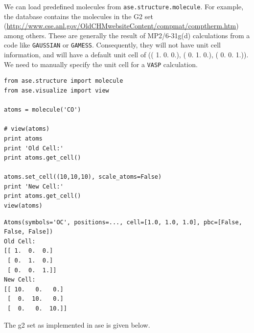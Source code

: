 \documentclass[11pt]{article}
\begin{document}
We can load predefined molecules from \verb~ase.structure.molecule~. For example, the database contains the molecules in the G2 set (\url{http://www.cse.anl.gov/OldCHMwebsiteContent/compmat/comptherm.htm}) among others. These are generally the result of MP2/6-31g(d) calculations from a code like \texttt{GAUSSIAN} or \texttt{GAMESS}. Consequently, they will not have unit cell information, and will have a default unit cell of  (( 1.  0.  0.), ( 0.  1.  0.), ( 0.  0.  1.)). We need to manually specify the unit cell for a \texttt{VASP} calculation.

\begin{verbatim}
from ase.structure import molecule
from ase.visualize import view

atoms = molecule('CO')

# view(atoms)
print atoms
print 'Old Cell:'
print atoms.get_cell()

atoms.set_cell((10,10,10), scale_atoms=False)
print 'New Cell:'
print atoms.get_cell()
view(atoms)
\end{verbatim}

\begin{verbatim}
Atoms(symbols='OC', positions=..., cell=[1.0, 1.0, 1.0], pbc=[False, False, False])
Old Cell:
[[ 1.  0.  0.]
 [ 0.  1.  0.]
 [ 0.  0.  1.]]
New Cell:
[[ 10.   0.   0.]
 [  0.  10.   0.]
 [  0.   0.  10.]]
\end{verbatim}

The g2 set as implemented in ase is given below.
\end{document}
